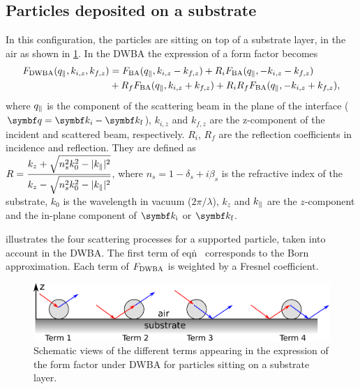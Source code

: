 \subsection{Particles deposited on a substrate}
In this configuration, the particles are sitting on top of a substrate layer, in the air as shown in \cref{fig:SchemDWBA}. In the DWBA the expression of a form factor becomes
\begin{align}
F_{\rm{DWBA}}(q_{\parallel}, k_{i,z}, k_{f,z}) &= F_{\rm{BA}}(q_{\parallel}, k_{i,z}-k_{f,z})+ R_i F_{\rm{BA}}(q_{\parallel}, -k_{i,z}-k_{f,z}) \nonumber \\
&+ R_f F_{\rm{BA}}(q_{\parallel}, k_{i,z}+k_{f,z}) + R_i R_f F_{\rm{BA}}(q_{\parallel},-k_{i,z}+k_{f,z}), \label{Edwbaair}
\end{align}
where $q_{\parallel}$ is the component of the scattering beam in the plane of the interface ($\q=\k_i-\k_\text{f}$), $k_{i,z}$ and $k_{f,z}$ are the z-component of the incident and scattered beam, respectively. $R_i$, $R_f$ are the reflection coefficients in incidence and reflection. They are defined as\\ $R=\dfrac{k_z+\sqrt{n_s^2k_0^2-|k_{\parallel}|^2}}{k_z-\sqrt{n_s^2 k_0^2-|k_{\parallel}|^2}}$, where $n_s=1-\delta_s +i \beta_s$ is the refractive index of the substrate, $k_0$ is the wavelength in vacuum ($2\pi /\lambda$), $k_z$ and $k_{\parallel}$ are the $z$-component and the in-plane component of $\k_\text{i}$ or $\k_\text{f}$. \\


\vspace{18pt}

 illustrates the four scattering processes for a supported particle, taken into account in the DWBA. The first term of eqn\.~  corresponds to the Born approximation. Each term of $F_{\rm{DWBA}}$ is weighted by a Fresnel coefficient.

\begin{figure}[tb]
\begin{center}
\includegraphics[width=\textwidth]{fig/drawing/drawingDWBA.pdf}
\end{center}
\caption{Schematic views of the different terms appearing in the expression of the form factor under DWBA for particles sitting on a substrate layer.}
\label{fig:SchemDWBA}
\end{figure}


